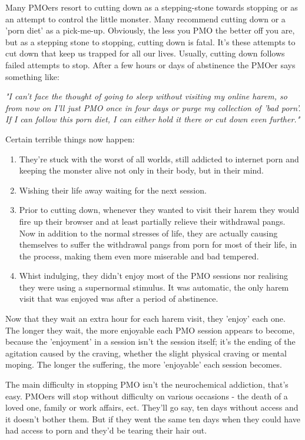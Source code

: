 \documentclass[easypeasy.tex]{subfiles}
\begin{document}
Many PMOers resort to cutting down as a stepping-stone towards stopping or as an attempt to control the little monster. Many recommend cutting down or a 'porn diet' as a pick-me-up. Obviously, the less you PMO the better off you are, but as a stepping stone to stopping, cutting down is fatal. It's these attempts to cut down that keep us trapped for all our lives. Usually, cutting down follows failed attempts to stop. After a few hours or days of abstinence the PMOer says something like:

  \textit{"I can't face the thought of going to sleep without visiting my online harem, so from now on I'll just PMO once in four days or purge my collection of 'bad porn'. If I can follow this porn diet, I can either hold it there or cut down even further."}

  Certain terrible things now happen:

 \begin{enumerate} 
  \item They're stuck with the worst of all worlds, still addicted to internet porn and keeping the monster alive not only in their body, but in their mind.

  \item Wishing their life away waiting for the next session.

  \item Prior to cutting down, whenever they wanted to visit their harem they would fire up their browser and at least partially relieve their withdrawal pangs. Now in addition to the normal stresses of life, they are actually causing themselves to suffer the withdrawal pangs from porn for most of their life, in the process, making them even more miserable and bad tempered.

  \item Whist indulging, they didn't enjoy most of the PMO sessions nor realising they were using a supernormal stimulus. It was automatic, the only harem visit that was enjoyed was after a period of abstinence.

\end{enumerate}
Now that they wait an extra hour for each harem visit, they 'enjoy' each one. The longer they wait, the more enjoyable each PMO session appears to become, because the 'enjoyment' in a session isn't the session itself; it's the ending of the agitation caused by the craving, whether the slight physical craving or mental moping. The longer the suffering, the more 'enjoyable' each session becomes.

The main difficulty in stopping PMO isn't the neurochemical addiction, that's easy. PMOers will stop without difficulty on various occasions - the death of a loved one, family or work affairs, ect. They'll go say, ten days without access and it doesn't bother them. But if they went the same ten days when they could have had access to porn and they'd be tearing their hair out.
\end{document}
